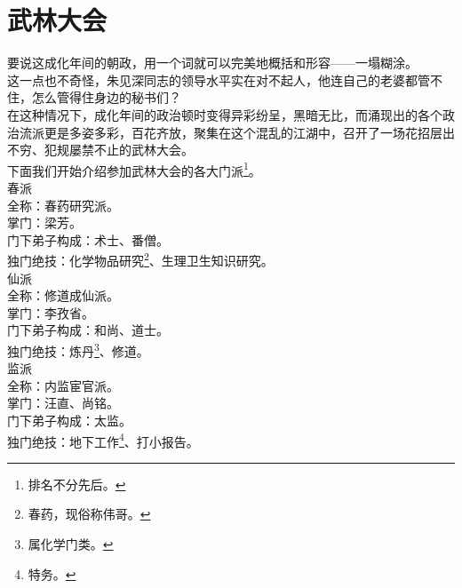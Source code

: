 \section{武林大会}
\ifnum{}
	\begin{multicols}{\theparacolNo}
\fi
要说这成化年间的朝政，用一个词就可以完美地概括和形容——一塌糊涂。\\

这一点也不奇怪，朱见深同志的领导水平实在对不起人，他连自己的老婆都管不住，怎么管得住身边的秘书们？\\

在这种情况下，成化年间的政治顿时变得异彩纷呈，黑暗无比，而涌现出的各个政治流派更是多姿多彩，百花齐放，聚集在这个混乱的江湖中，召开了一场花招层出不穷、犯规屡禁不止的武林大会。\\

下面我们开始介绍参加武林大会的各大门派\footnote{排名不分先后。}。\\

春派\\

全称：春药研究派。\\

掌门：梁芳。\\

门下弟子构成：术士、番僧。\\

独门绝技：化学物品研究\footnote{春药，现俗称伟哥。}、生理卫生知识研究。\\

仙派\\

全称：修道成仙派。\\

掌门：李孜省。\\

门下弟子构成：和尚、道士。\\

独门绝技：炼丹\footnote{属化学门类。}、修道。\\

监派\\

全称：内监宦官派。\\

掌门：汪直、尚铭。\\

门下弟子构成：太监。\\

独门绝技：地下工作\footnote{特务。}、打小报告。\\


\end{multicols}
